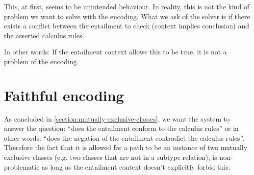 \documentclass[a4paper]{article}
\begin{document}
This, at first, seems to be unintended behaviour.
In reality, this is not the kind of problem we want to solve with the encoding.
What we ask of the solver is if there exists a conflict between
the entailment to check (context implies conclusion)
and the asserted calculus rules.

In other words: If the entailment context allows this to be true,
it is not a problem of the encoding.

 \section{Faithful encoding}
 As concluded in \ref{section:mutually-exclusive-classes},
 we want the system to answer the question:
 ``does the entailment conform to the calculus rules'' or in other words:
 ``does the negation of the entailment contradict the calculus rules''.
 Therefore the fact that it is allowed for a path to be an instance of
 two mutually exclusive classes (e.g. two classes that are not in a subtype relation),
 is non-problematic as long as the entailment context doesn't explicitly forbid this.

%
%

\end{document}
